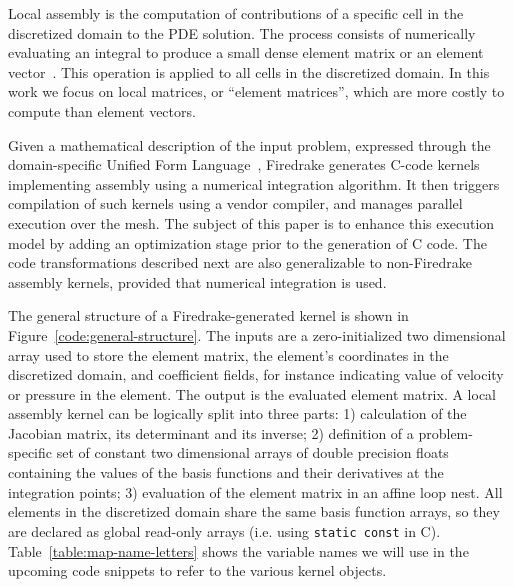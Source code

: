 \documentclass[conference]{IEEEtran}
\begin{document}
Local assembly is the computation of contributions of a specific cell in the discretized domain to the PDE solution. The process consists of numerically evaluating an integral to produce a small dense element matrix or an element vector~\cite{quadrature1, fluidity_manual_v4}. This operation is applied to all cells in the discretized domain. In this work we focus on local matrices, or ``element matrices'', which are more costly to compute than element vectors.

Given a mathematical description of the input problem, expressed through the domain-specific Unified Form Language~\cite{ufl}, Firedrake generates C-code kernels implementing assembly using a numerical integration algorithm. It then triggers compilation of such kernels using a vendor compiler, and manages parallel execution over the mesh. The subject of this paper is to enhance this execution model by adding an optimization stage prior to the generation of C code. The code transformations described next are also generalizable to non-Firedrake assembly kernels, provided that numerical integration is used.

The general structure of a Firedrake-generated kernel is shown in Figure~\ref{code:general-structure}. The inputs are a zero-initialized two dimensional array used to store the element matrix, the element's coordinates in the discretized domain, and coefficient fields, for instance indicating value of velocity or pressure in the element. The output is the evaluated element matrix. A local assembly kernel can be logically split into three parts: 1) calculation of the Jacobian matrix, its determinant and its inverse; 2) definition of a problem-specific set of constant two dimensional arrays of double precision floats containing the values of the basis functions and their derivatives at the integration points; 3) evaluation of the element matrix in an affine loop nest. All elements in the discretized domain share the same basis function arrays, so they are declared as global read-only arrays (i.e. using \texttt{static const} in C). Table~\ref{table:map-name-letters} shows the variable names we will use in the upcoming code snippets to refer to the various kernel objects.
\end{document}
